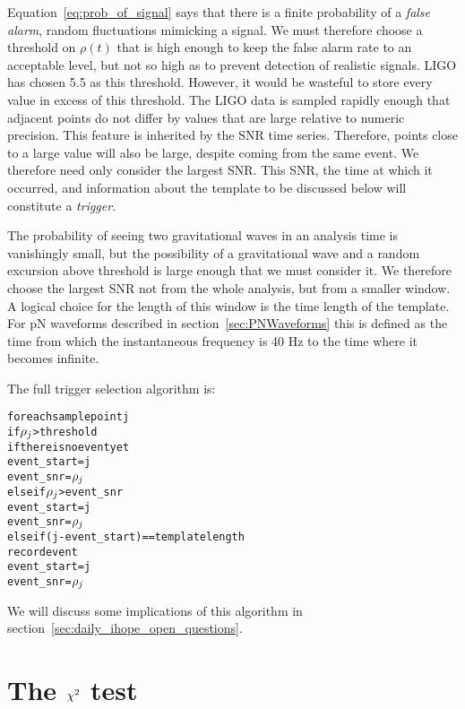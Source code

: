 Equation~\ref{eq:prob_of_signal} says that there is a finite
probability of a \emph{false alarm}, random fluctuations mimicking a
signal.  We must therefore choose a threshold on $\rho(t)$ that is
high enough to keep the false alarm rate to an acceptable level, but
not so high as to prevent detection of realistic signals.  LIGO has
chosen 5.5 as this threshold.  However, it would be wasteful to store
every value in excess of this threshold.  The LIGO data is sampled
rapidly enough that adjacent points do not differ by values that are
large relative to numeric precision.  This feature is inherited by the
SNR time series.  Therefore, points close to a large value will also
be large, despite coming from the same event.  We therefore need only
consider the largest SNR.  This SNR,  the time at which it occurred,
and information about the template to be discussed below will
constitute a \emph{trigger}.

The probability of seeing two gravitational waves in an analysis time
is vanishingly small, but the possibility of a gravitational wave and
a random excursion above threshold is large enough that we must
consider it.  We therefore choose the largest SNR not from the whole
analysis, but from a smaller window.  A logical choice for the length
of this window is the time length of the template.  For pN waveforms
described in section~\ref{sec:PNWaveforms} this is defined as the time
from which the instantaneous frequency is 40 Hz to the time where it
becomes infinite.

The full trigger selection algorithm is:
\newpage

\begin{alltt}
for each sample point j
  if \(\rho\sb{j}\) > threshold
    if there is no event yet
      event\_start = j
      event\_snr   = \(\rho\sb{j}\)
    else if \(\rho\sb{j}\) > event\_snr
      event\_start = j
      event\_snr = \(\rho\sb{j}\)
    else if (j - event\_start) == template length
      record event
      event\_start = j
      event\_snr   = \(\rho\sb{j}\)
\end{alltt}

We will discuss some implications of this algorithm in
section~\ref{sec:daily_ihope_open_questions}.

\section{The $\chi^2$ test}
\label{sec:ihope_chisq}

